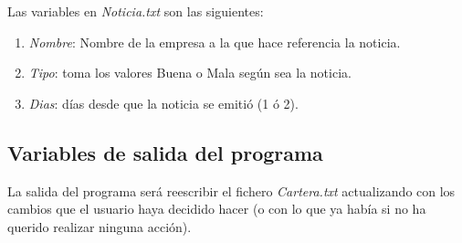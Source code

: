 \documentclass[12pt]{article}
\begin{document}
Las variables en \textit{Noticia.txt} son las siguientes:
\begin{enumerate}
\item \textit{Nombre}: Nombre de la empresa a la que hace referencia la noticia.
\item \textit{Tipo}: toma los valores Buena o Mala según sea la noticia.
\item \textit{Dias}: días desde que la noticia se emitió (1 ó 2).
\end{enumerate}

\subsection{Variables de salida del programa}
La salida del programa será reescribir el fichero \textit{Cartera.txt} actualizando con los cambios que el usuario haya decidido hacer (o con lo que ya había si no ha querido realizar ninguna acción).
\end{document}
